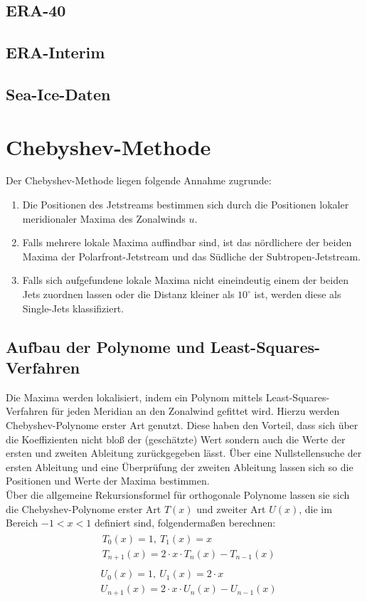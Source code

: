 \subsection{ERA-40}
\subsection{ERA-Interim}
\subsection{Sea-Ice-Daten}

\section{Chebyshev-Methode}
Der Chebyshev-Methode liegen folgende Annahme zugrunde:
\begin{enumerate}
  \item Die Positionen des Jetstreams bestimmen sich durch die Positionen lokaler meridionaler Maxima des Zonalwinds $u$.
  \item Falls mehrere lokale Maxima auffindbar sind, ist das nördlichere der beiden Maxima der Polarfront-Jetstream und das Südliche der Subtropen-Jetstream.
  \item Falls sich aufgefundene lokale Maxima nicht eineindeutig einem der beiden Jets zuordnen lassen oder die Distanz kleiner als $10^\circ$ ist, werden diese als Single-Jets klassifiziert.
\end{enumerate}

\subsection{Aufbau der Polynome und Least-Squares-Verfahren}
Die Maxima werden lokalisiert, indem ein Polynom mittels Least-Squares-Verfahren für jeden Meridian an den Zonalwind gefittet wird. Hierzu werden Chebyshev-Polynome erster Art genutzt. Diese haben den Vorteil, dass sich über die Koeffizienten nicht bloß der (geschätzte) Wert sondern auch die Werte der ersten und zweiten Ableitung zurückgegeben lässt. Über eine Nullstellensuche der ersten Ableitung und eine Überprüfung der zweiten Ableitung lassen sich so die Positionen und Werte der Maxima bestimmen. \\
Über die allgemeine Rekursionsformel für orthogonale Polynome \citep{Abramowitz-1972} lassen sie sich die Chebyshev-Polynome erster Art $T(x)$ und zweiter Art $U(x)$, die im Bereich $-1 < x < 1$ definiert sind, folgendermaßen berechnen:
\begin{align}
\begin{split}
& T_0(x) = 1, \: T_1(x) = x \\
& T_{n+1}(x) = 2 \cdot x \cdot T_n(x) - T_{n-1}(x)
\end{split}
\end{align} 
\begin{align}
\begin{split}
& U_0(x) = 1, \: U_1(x) = 2 \cdot x \\ 
& U_{n+1}(x) = 2 \cdot x \cdot U_n(x) - U_{n-1}(x)
\end{split}
\end{align}

